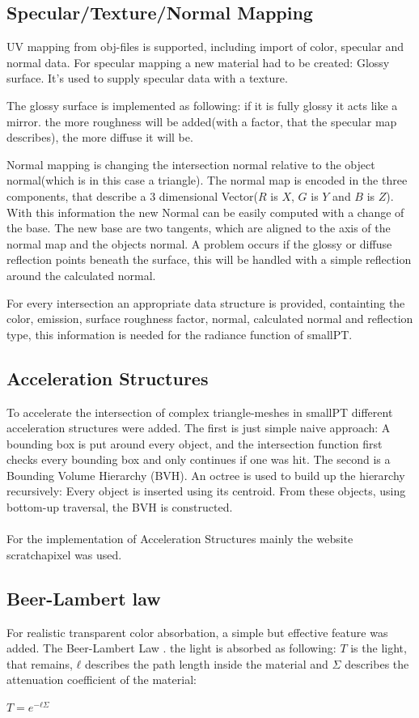 \documentclass[11pt,a4paper]{article}
\begin{document}
\subsection{Specular/Texture/Normal Mapping}
UV mapping from obj-files is supported, including import of color, specular and normal data.
For specular mapping a new material had to be created: Glossy surface. It's used to supply specular data with a texture. 

The glossy surface is implemented as following: if it is fully glossy it acts like a mirror. the more roughness will be added(with a factor, that the specular map describes), the more diffuse it will be. 

Normal mapping is changing the intersection normal relative to the object normal(which is in this case a triangle). The normal map is encoded in the three components, that describe a 3 dimensional Vector($R$ is $X$, $G$ is $Y$ and $B$ is $Z$).
With this information the new Normal can be easily computed with a change of the base. The new base are two tangents, which are aligned to the axis of the normal map and the objects normal.
A problem occurs if the glossy or diffuse reflection points beneath the surface, this will be handled with a simple reflection around the calculated normal.

For every intersection an appropriate data structure is provided, containting the color, emission, surface roughness factor, normal, calculated normal and reflection type, this information is needed for the radiance function of smallPT.

\subsection{Acceleration Structures}
To accelerate the intersection of complex triangle-meshes in smallPT different acceleration structures were added.
The first is just simple naive approach: A bounding box is put around every object, and the intersection function first checks every bounding box and only continues if one was hit.
The second is a  Bounding Volume Hierarchy (BVH). An octree is used to build up the hierarchy recursively: Every object is inserted using its centroid. From these objects, using bottom-up traversal, the BVH is constructed.
\\
\\
For the implementation of Acceleration Structures mainly the website scratchapixel \cite{link:scratch}
was used.
\subsection{Beer-Lambert law}
For realistic transparent color absorbation, a simple but effective feature was added. The Beer-Lambert Law \cite{link:beerlambert} . the light is absorbed as following: $T$ is the light, that remains, $ℓ$ describes the path length inside the material and $\Sigma$ describes the attenuation coefficient of the material:
\begin{center}
$T = e^{-ℓ \Sigma}$
\end{center}
\end{document}
